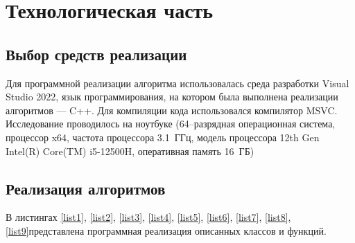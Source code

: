 \chapter{Технологическая часть}

\section{Выбор средств реализации}
Для программной реализации алгоритма использовалась среда разработки Visual Studio 2022, язык программирования, на котором была выполнена реализации алгоритмов --- C++.
Для компиляции кода использовался компилятор MSVC. Исследование проводилось на ноутбуке (64--разрядная операционная система, процессор x64, частота процессора 3.1~ГГц, модель процессора 12th Gen Intel(R) Core(TM) i5-12500H, оперативная память 16~ГБ)
\section{Реализация алгоритмов}
В листингах \ref{list1}, \ref{list2}, \ref{list3}, \ref{list4}, \ref{list5}, \ref{list6}, \ref{list7}, \ref{list8}, \ref{list9}представлена программная реализация описанных классов и функций.
